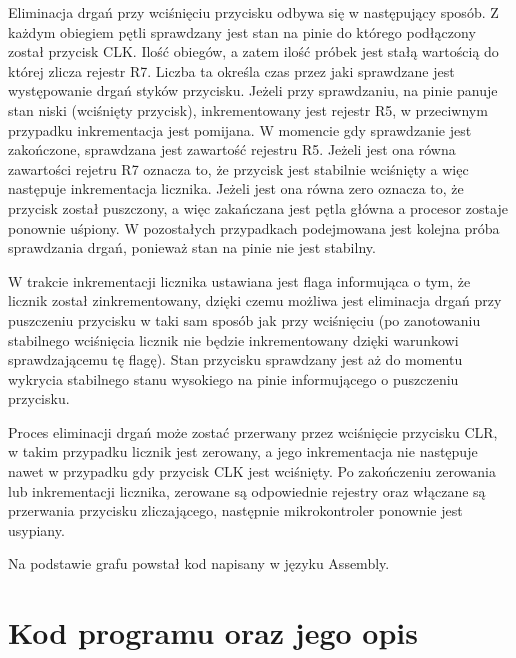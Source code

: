 \documentclass[fleqn]{article}
\begin{document}
Eliminacja drgań przy wciśnięciu przycisku odbywa się w następujący sposób. Z każdym obiegiem pętli sprawdzany jest stan na pinie do którego podłączony został przycisk CLK. Ilość obiegów, a zatem ilość próbek jest stałą wartością do której zlicza rejestr R7. Liczba ta określa czas przez jaki sprawdzane jest występowanie drgań styków przycisku. Jeżeli przy sprawdzaniu, na pinie panuje stan niski (wciśnięty przycisk), inkrementowany jest rejestr R5, w przeciwnym przypadku inkrementacja jest pomijana. W momencie gdy sprawdzanie jest zakończone, sprawdzana jest zawartość rejestru R5. Jeżeli jest ona równa zawartości rejetru R7 oznacza to, że przycisk jest stabilnie wciśnięty a więc następuje inkrementacja licznika. Jeżeli jest ona równa zero oznacza to, że przycisk został puszczony, a więc zakańczana jest pętla główna a procesor zostaje ponownie uśpiony. W pozostałych przypadkach podejmowana jest kolejna próba sprawdzania drgań, ponieważ stan na pinie nie jest stabilny.

W trakcie inkrementacji licznika ustawiana jest flaga informująca o tym, że licznik został zinkrementowany, dzięki czemu możliwa jest eliminacja drgań przy puszczeniu przycisku w taki sam sposób jak przy wciśnięciu (po zanotowaniu stabilnego wciśnięcia licznik nie będzie inkrementowany dzięki warunkowi sprawdzającemu tę flagę). Stan przycisku sprawdzany jest aż do momentu wykrycia stabilnego stanu wysokiego na pinie informującego o puszczeniu przycisku.

Proces eliminacji drgań może zostać przerwany przez wciśnięcie przycisku CLR, w takim przypadku licznik jest zerowany, a jego inkrementacja nie następuje nawet w przypadku gdy przycisk CLK jest wciśnięty. Po zakończeniu zerowania lub inkrementacji licznika, zerowane są odpowiednie rejestry oraz włączane są przerwania przycisku zliczającego, następnie mikrokontroler ponownie jest usypiany.

Na podstawie grafu powstał kod napisany w języku Assembly.



\section{Kod programu oraz jego opis}
\end{document}
